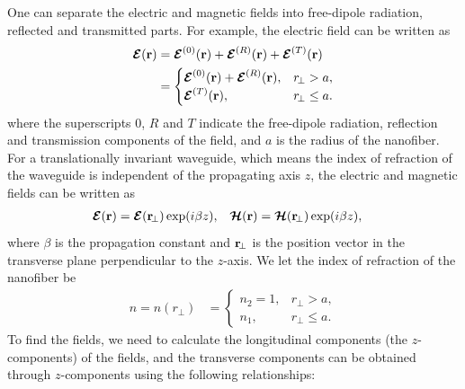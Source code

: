 \documentclass[preprint,aps,pra,onecolumn]{revtex4-1} %
\begin{document}
One can separate the electric and magnetic fields into free-dipole radiation, reflected and transmitted parts. For example, the electric field can be written as 
\begin{align}
\boldsymbol{\mathcal{E}}(\mathbf{r}) &= \boldsymbol{\mathcal{E}}^{(0)}(\mathbf{r}) + 
\boldsymbol{\mathcal{E}}^{(R)}(\mathbf{r})+\boldsymbol{\mathcal{E}}^{(T)}(\mathbf{r})\\
&=
	\begin{cases}
	  \boldsymbol{\mathcal{E}}^{(0)} (\mathbf{r})+ \boldsymbol{\mathcal{E}}^{(R)}(\mathbf{r}), & r\!_\perp > a,\\
	  \boldsymbol{\mathcal{E}}^{(T)}(\mathbf{r}), & r\!_\perp\leq a.
	\end{cases} \label{Etotalfiber}
\end{align}
where the superscripts $0$, $R$ and $T$ indicate the free-dipole radiation, reflection and transmission components of the field, and $ a $ is the radius of the nanofiber. For a translationally invariant waveguide, which means the index of refraction of the waveguide is independent of the propagating axis $z$, the electric and magnetic fields can be written as 
\begin{align}
\boldsymbol{\mathcal{E}}(\mathbf{r}) &= \boldsymbol{\mathcal{E}}(\mathbf{r}\!_\perp)\exp(i\beta z), & \boldsymbol{\mathcal{H}}(\mathbf{r}) &= \boldsymbol{\mathcal{H}}(\mathbf{r}\!_\perp)\exp(i\beta 
z),
\end{align}
where $ \beta $ is the propagation constant and $ \mathbf{r}\!_\perp $ is the position vector in the transverse 
plane perpendicular to the $ z $-axis. We let the index of refraction of the nanofiber be
\begin{align}
n=n(r\!_\perp)&=\begin{cases}
	  n_2=1, & r\!_\perp > a,\\
	  n_1, & r\!_\perp\leq a.
	\end{cases} \label{nfiber}
\end{align}
To find the fields, we need to calculate the longitudinal components (the $z$-components) of the fields, and the transverse components can be obtained through $z$-components using the following relationships:
\end{document}
